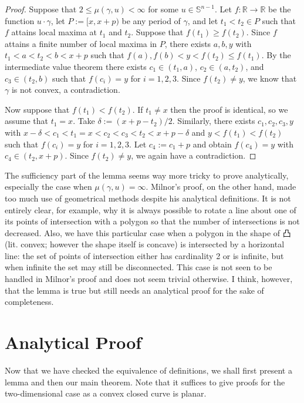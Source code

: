 \documentclass{amsart}
\theoremstyle{definition}
\theoremstyle{remark}
\begin{document}
\begin{proof}
    Suppose that $2\le\mu(\gamma,u)<\infty$
    for some $u\in\mathbb{S}^{n-1}$.
    Let $f:\mathbb{R}\to\mathbb{R}$ be the function $u\cdot\gamma$,
    let $P:=[x,x+p)$ be any period of $\gamma$, and let $t_1<t_2\in P$
    such that $f$ attains local maxima at $t_1$ and $t_2$.
    Suppose that $f(t_1)\ge f(t_2)$.
    Since $f$ attains a finite number of local maxima in $P$,
    there exists $a,b,y$ with $t_1<a<t_2<b<x+p$ such that
    $f(a),f(b)<y<f(t_2)\le f(t_1)$.
    By the intermediate value theorem there exists
    $c_1\in(t_1,a)$, $c_2\in(a,t_2)$, and $c_3\in(t_2,b)$ such that
    $f(c_i)=y$ for $i=1,2,3$. Since $f(t_2)\ne y$, we know that
    $\gamma$ is not convex, a contradiction.

    Now suppose that $f(t_1)<f(t_2)$.
    If $t_1\ne x$ then the proof is identical,
    so we assume that $t_1=x$. Take $\delta:=(x+p-t_2)/2$.
    Similarly, there exists $c_1,c_2,c_3,y$ with
    $x-\delta<c_1<t_1=x<c_2<c_3<t_2<x+p-\delta$
    and $y<f(t_1)<f(t_2)$ such that
    $f(c_i)=y$ for $i=1,2,3$.
    Let $c_4:=c_1+p$ and obtain $f(c_4)=y$ with $c_4\in(t_2,x+p)$.
    Since $f(t_2)\ne y$, we again have a contradiction.
\end{proof}

The sufficiency part of the lemma seems way more tricky to prove
analytically, especially the case when $\mu(\gamma,u)=\infty$.
Milnor's proof, on the other hand, made too much use of
geometrical methods despite his analytical definitions.
It is not entirely clear, for example, why it is always possible
to rotate a line about one of its points of intersection with
a polygon so that the number of intersections is not decreased.
Also, we have this particular case when a polygon in the shape of 凸
(lit. convex; however the shape itself is concave)
is intersected by a horizontal line: the set of points of intersection
either has cardinality 2 or is infinite, but when infinite
the set may still be disconnected. This case is not seen to
be handled in Milnor's proof and does not seem trivial otherwise.
I think, however, that the lemma is true but still needs
an analytical proof for the sake of completeness.

\section{Analytical Proof}

Now that we have checked the equivalence of definitions,
we shall first present a lemma and then our main theorem.
Note that it suffices to give proofs for the two-dimensional case
as a convex closed curve is planar.
\end{document}
